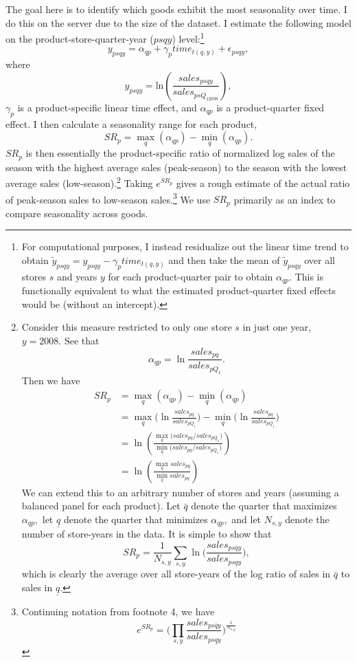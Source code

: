 \documentclass[]{article}
\let\rmarkdownfootnote\footnote%
\def\footnote{\protect\rmarkdownfootnote}
\begin{document}
The goal here is to identify which goods exhibit the most seasonality
over time. I do this on the server due to the size of the dataset. I
estimate the following model on the product-store-quarter-year
(\(psqy\)) level:\footnote{For computational purposes, I instead
  residualize out the linear time trend to obtain
  \(\widetilde{y}_{psqy} = y_{psqy} - \gamma_ptime_{t(q,y)}\) and then
  take the mean of \(\widetilde{y}_{psqy}\) over all stores \(s\) and
  years \(y\) for each product-quarter pair to obtain \(\alpha_{qp}.\)
  This is functionally equivalent to what the estimated product-quarter
  fixed effects would be (without an intercept).}
\[ y_{psqy} = \alpha_{qp} + \gamma_ptime_{t(q,y)} + \epsilon_{psqy},\]
where
\[y_{psqy} = \textrm{ln}\left(\frac{sales_{psqy}}{sales_{psQ_12008}}\right),\]
\(\gamma_p\) is a product-specific linear time effect, and
\(\alpha_{qp}\) is a product-quarter fixed effect. I then calculate a
seasonality range for each product,
\[SR_p = \max_{q}(\alpha_{qp})-\min_{q}(\alpha_{qp}).\] \(SR_p\) is then
essentially the product-specific ratio of normalized log sales of the
season with the highest average sales (peak-season) to the season with
the lowest average sales (low-season).\footnote{Consider this measure
  restricted to only one store \(s\) in just one year, \(y=2008.\) See
  that \[\alpha_{qp} = \ln{\frac{sales_{pq}}{sales_{pQ_1}}}.\] Then we
  have \[
  \begin{aligned}
  SR_p &= \max_{q}(\alpha_{qp})-\min_{q}(\alpha_{qp}) \\
  &= \max_{q}\biggl(\ln{\frac{sales_{pq}}{sales_{pQ_1}}}\biggr) - \min_{q}\biggl(\ln{\frac{sales_{pq}}{sales_{pQ_1}}}\biggr) \\
  &= \ln{\left(\frac{\max_q{(sales_{pq}/sales_{pQ_1}})}{\min_q{(sales_{pq}/sales_{pQ_1}})}\right)} \\
  &= \ln{\left(\frac{\max_q{sales_{pq}}}{\min_q{sales_{pq}}}\right)}
  \end{aligned}
  \] We can extend this to an arbitrary number of stores and years
  (assuming a balanced panel for each product). Let \(\bar{q}\) denote
  the quarter that maximizes \(\alpha_{qp},\) let \(\underline{q}\)
  denote the quarter that minimizes \(\alpha_{qp},\) and let \(N_{s,y}\)
  denote the number of store-years in the data. It is simple to show
  that \[
  SR_p = \frac{1}{N_{s,y}}\sum_{s,y}\ln\biggl(\frac{sales_{ps\bar{q}y}}{sales_{ps\underline{q}y}}\biggr),
  \] which is clearly the average over all store-years of the log ratio
  of sales in \(\bar{q}\) to sales in \(\underline{q}.\)} Taking
\(e^{SR_p}\) gives a rough estimate of the actual ratio of peak-season
sales to low-season sales.\footnote{Continuing notation from footnote 4,
  we have
  \[ e^{SR_p} = \biggl(\prod_{s,y}\frac{sales_{ps\bar{q}y}}{sales_{ps\underline{q}y}}\biggr)^{\frac{1}{N_{s,y}}}\]}
We use \(SR_p\) primarily as an index to compare seasonality across
goods.
\end{document}
